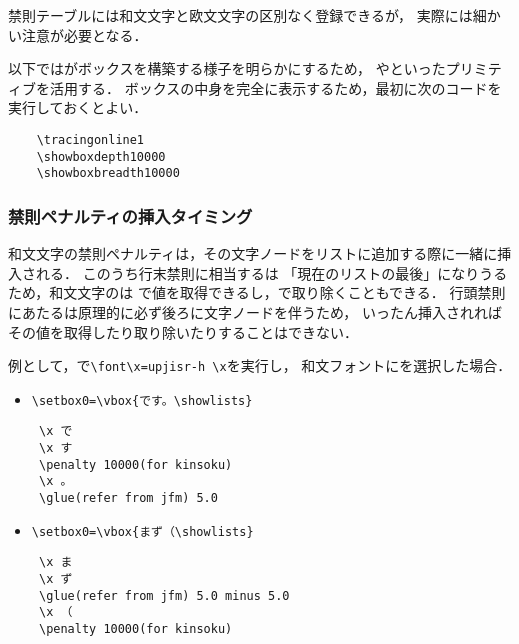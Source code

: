 \documentclass[paper=a4,twocolumn,line_length=24zw,number_of_lines=43]{jlreq}
\begin{document}
禁則テーブルには和文文字と欧文文字の区別なく登録できるが，
実際には細かい注意が必要となる．

\dbendrule

以下では\pTeX がボックスを構築する様子を明らかにするため，
やといったプリミティブを活用する．
ボックスの中身を完全に表示するため，最初に次のコードを実行しておくとよい．
\begin{verbatim}
    \tracingonline1
    \showboxdepth10000
    \showboxbreadth10000
\end{verbatim}

\subsubsection{禁則ペナルティの挿入タイミング}

和文文字の禁則ペナルティは，その文字ノードをリストに追加する際に一緒に挿入される．
このうち行末禁則に相当するは
「現在のリストの最後」になりうるため，和文文字のは
で値を取得できるし，で取り除くこともできる．
行頭禁則にあたるは原理的に必ず後ろに文字ノードを伴うため，
いったん挿入されればその値を取得したり取り除いたりすることはできない．

例として，\upTeX で\verb+\font\x=upjisr-h \x+を実行し，
和文フォントにを選択した場合．
\begin{itemize}
  \item \verb+\setbox0=\vbox{です。\showlists}+
\begin{verbnote}
\begin{verbatim}
 \x で
 \x す
 \penalty 10000(for kinsoku)
 \x 。
 \glue(refer from jfm) 5.0
\end{verbatim}
\end{verbnote}
  \item \verb+\setbox0=\vbox{まず（\showlists}+
\begin{verbnote}
\begin{verbatim}
 \x ま
 \x ず
 \glue(refer from jfm) 5.0 minus 5.0
 \x （
 \penalty 10000(for kinsoku)
\end{verbatim}
\end{verbnote}
\end{itemize}
\end{document}
